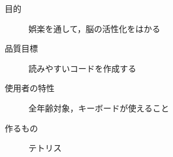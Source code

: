 \begin{description}
  \item[目的] 娯楽を通して，脳の活性化をはかる
  \item[品質目標] 読みやすいコードを作成する
  \item[使用者の特性] 全年齢対象，キーボードが使えること
  \item[作るもの] テトリス
\end{description}
